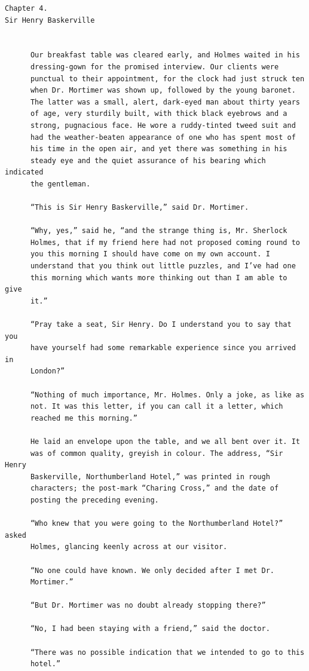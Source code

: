 \documentclass{article}
\begin{document}
\begin{verbatim}
Chapter 4.
Sir Henry Baskerville


      Our breakfast table was cleared early, and Holmes waited in his
      dressing-gown for the promised interview. Our clients were
      punctual to their appointment, for the clock had just struck ten
      when Dr. Mortimer was shown up, followed by the young baronet.
      The latter was a small, alert, dark-eyed man about thirty years
      of age, very sturdily built, with thick black eyebrows and a
      strong, pugnacious face. He wore a ruddy-tinted tweed suit and
      had the weather-beaten appearance of one who has spent most of
      his time in the open air, and yet there was something in his
      steady eye and the quiet assurance of his bearing which indicated
      the gentleman.

      “This is Sir Henry Baskerville,” said Dr. Mortimer.

      “Why, yes,” said he, “and the strange thing is, Mr. Sherlock
      Holmes, that if my friend here had not proposed coming round to
      you this morning I should have come on my own account. I
      understand that you think out little puzzles, and I’ve had one
      this morning which wants more thinking out than I am able to give
      it.”

      “Pray take a seat, Sir Henry. Do I understand you to say that you
      have yourself had some remarkable experience since you arrived in
      London?”

      “Nothing of much importance, Mr. Holmes. Only a joke, as like as
      not. It was this letter, if you can call it a letter, which
      reached me this morning.”

      He laid an envelope upon the table, and we all bent over it. It
      was of common quality, greyish in colour. The address, “Sir Henry
      Baskerville, Northumberland Hotel,” was printed in rough
      characters; the post-mark “Charing Cross,” and the date of
      posting the preceding evening.

      “Who knew that you were going to the Northumberland Hotel?” asked
      Holmes, glancing keenly across at our visitor.

      “No one could have known. We only decided after I met Dr.
      Mortimer.”

      “But Dr. Mortimer was no doubt already stopping there?”

      “No, I had been staying with a friend,” said the doctor.

      “There was no possible indication that we intended to go to this
      hotel.”


\end{verbatim}
\end{document}
